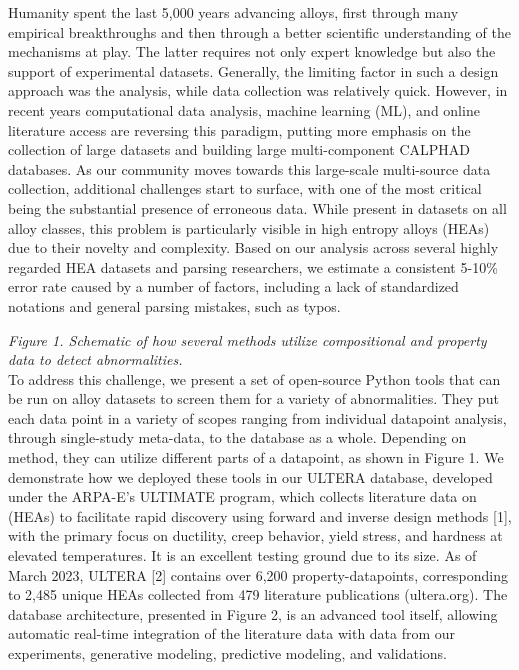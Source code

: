 Humanity spent the last 5,000 years advancing alloys, first through many empirical breakthroughs and then through a better scientific understanding of the mechanisms at play. The latter requires not only expert knowledge but also the support of experimental datasets. Generally, the limiting factor in such a design approach was the analysis, while data collection was relatively quick. However, in recent years computational data analysis, machine learning (ML), and online literature access are reversing this paradigm, putting more emphasis on the collection of large datasets and building large multi-component CALPHAD databases.
As our community moves towards this large-scale multi-source data collection, additional challenges start to surface, with one of the most critical being the substantial presence of erroneous data. While present in datasets on all alloy classes, this problem is particularly visible in high entropy alloys (HEAs) due to their novelty and complexity. Based on our analysis across several highly regarded HEA datasets and parsing researchers, we estimate a consistent 5-10\% error rate caused by a number of factors, including a lack of standardized notations and general parsing mistakes, such as typos.

\vspace{24pt}
\textit{Figure 1. Schematic of how several methods utilize compositional and property data to detect abnormalities.}\\


To address this challenge, we present a set of open-source Python tools that can be run on alloy datasets to screen them for a variety of abnormalities. They put each data point in a variety of scopes ranging from individual datapoint analysis, through single-study meta-data, to the database as a whole. Depending on method, they can utilize different parts of a datapoint, as shown in Figure 1.
We demonstrate how we deployed these tools in our ULTERA database, developed under the ARPA-E's ULTIMATE program, which collects literature data on (HEAs) to facilitate rapid discovery using forward and inverse design methods [1], with the primary focus on ductility, creep behavior, yield stress, and hardness at elevated temperatures. It is an excellent testing ground due to its size. As of March 2023, ULTERA [2] contains over 6,200 property-datapoints, corresponding to 2,485 unique HEAs collected from 479 literature publications (ultera.org). The database architecture, presented in Figure 2, is an advanced tool itself, allowing automatic real-time integration of the literature data with data from our experiments, generative modeling, predictive modeling, and validations.





